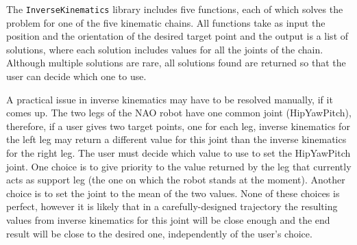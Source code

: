 The \texttt{InverseKinematics} library includes five functions, each of which solves the problem for one of the five kinematic chains. All functions take as input the position and the orientation of the desired target point and the output is a list of solutions, where each solution includes values for all the joints of the chain. Although multiple solutions are rare, all solutions found are returned so that the user can decide which one to use.

A practical issue in inverse kinematics may have to be resolved manually, if it comes up. The two legs of the NAO robot have one common joint (HipYawPitch), therefore, if a user gives two target points, one for each leg, inverse kinematics for the left leg may return a different value for this joint than the inverse kinematics for the right leg. The user must decide which value to use to set the HipYawPitch joint. One choice is to give priority to the value returned by the leg that currently acts as support leg (the one on which the robot stands at the moment). Another choice is to set the joint to the mean of the two values. None of these choices is perfect, however it is likely that in a carefully-designed trajectory the resulting values from inverse kinematics for this joint will be close enough and the end result will be close to the desired one, independently of the user's choice. 